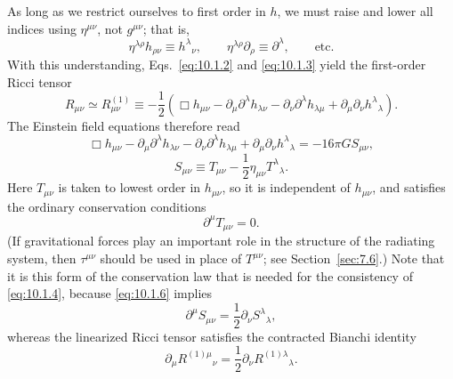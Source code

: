 As long as we restrict ourselves to first order in \(h\), we must raise and
lower all indices using \(\eta^{\mu\nu}\), not \(g^{\mu\nu}\); that is,
\[
  \eta^{\lambda\rho}h_{\rho\nu}\equiv h^\lambda{}_\nu,
  \qquad
  \eta^{\lambda\rho}\partial_\rho\equiv\partial^\lambda,
  \qquad\text{etc.}
\]
With this understanding, Eqs.~\eqref{eq:10.1.2} and \eqref{eq:10.1.3}
yield the first-order Ricci tensor
\[
  R_{\mu\nu}\simeq R^{(1)}_{\mu\nu}
  \equiv
  -\frac12
  \left(
    \Box h_{\mu\nu}
    -\partial_\mu\partial^\lambda h_{\lambda\nu}
    -\partial_\nu\partial^\lambda h_{\lambda\mu}
    +\partial_\mu\partial_\nu h^\lambda{}_\lambda
  \right).
\]
The Einstein field equations therefore read
\begin{equation}
  \Box h_{\mu\nu}
  -\partial_\mu\partial^\lambda h_{\lambda\nu}
  -\partial_\nu\partial^\lambda h_{\lambda\mu}
  +\partial_\mu\partial_\nu h^\lambda{}_\lambda
  =-16\pi G S_{\mu\nu},
  \tag{10.1.4}\label{eq:10.1.4}
\end{equation}
\begin{equation}
  S_{\mu\nu}
  \equiv
  T_{\mu\nu}-\frac12\eta_{\mu\nu}T^\lambda{}_\lambda.
  \tag{10.1.5}\label{eq:10.1.5}
\end{equation}
Here \(T_{\mu\nu}\) is taken to lowest order in \(h_{\mu\nu}\), so it is
independent of \(h_{\mu\nu}\), and satisfies the ordinary conservation
conditions
\begin{equation}
  \partial^\mu T_{\mu\nu}=0.
  \tag{10.1.6}\label{eq:10.1.6}
\end{equation}
(If gravitational forces play an important role in the structure of the
radiating system, then \(\tau^{\mu\nu}\) should be used in place of
\(T^{\mu\nu}\); see Section~\ref{sec:7.6}.) Note that it is this form of the
conservation law that is needed for the consistency of \eqref{eq:10.1.4},
because \eqref{eq:10.1.6} implies
\[
  \partial^\mu S_{\mu\nu}
  =\frac12\partial_\nu S^\lambda{}_\lambda,
\]
whereas the linearized Ricci tensor satisfies the contracted Bianchi identity
\[
  \partial_\mu R^{(1)\mu}{}_\nu
  =
  \frac12\partial_\nu R^{(1)\lambda}{}_\lambda.
\]

